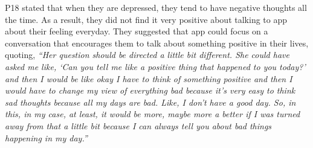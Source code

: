         P18 stated that when they are depressed, they tend to have negative thoughts all the time. 
        As a result, they did not find it very positive about talking to \acl{app} about their feeling everyday. They suggested that \acl{app} could focus on a conversation that encourages them to talk about something positive in their lives, quoting,
        \textit{``Her question should be directed a little bit different. She could have asked me like, `Can you tell me like a positive thing that happened to you today?' and then I would be like okay I have to think of something positive and then I would have to change my view of everything bad because it's very easy to think sad thoughts
        because all my days are bad. Like, I don't have a good day. 
        So, in this, in my case, at least, it would be more, maybe more a better if I was turned away from that a little bit because I can always tell you about bad things happening in my day.''}
        
